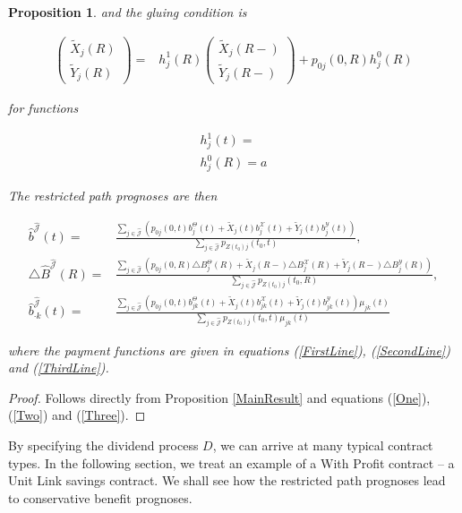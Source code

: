 \documentclass{article}
\newcommand{\1}[1]{\mathbbm{1}_{\left\lbrace #1 \right\rbrace}}
\theoremstyle{break}
\newtheorem{proposition}[definition]{Proposition}%
\theoremstyle{remark}
\numberwithin{equation}{section}
\begin{document}
\begin{proposition}
and the gluing condition is

\begin{align*}
\begin{pmatrix}\tilde{X}_j(R) \\ \tilde{Y}_j(R)\end{pmatrix} =& h_j^1(R) \begin{pmatrix}\tilde{X}_j(R-) \\ \tilde{Y}_j(R-)\end{pmatrix} + p_{0j}(0,R) h_j^0(R)
\end{align*}

for functions

\begin{align*}
	h_j^1(t) = \\
	h_j^0(R) = a
\end{align*}

The restricted path prognoses are then

\begin{align*}
	\hat{b}^{\hat{\mathcal{J}}}(t) =& \frac{\sum_{j \in \hat{\mathcal{J}}} \left( p_{0j}(0,t) b_j^\Theta(t) + \tilde{X}_j(t) b_j^\mathcal{X}(t) + \tilde{Y}_j(t) b_j^\mathcal{Y}(t)\right)}{\sum_{j \in \hat{\mathcal{J}}} p_{Z(t_0)j}(t_0,t)}, \\
	\triangle \hat{B}^{\hat{\mathcal{J}}}(R) =& \frac{\sum_{j \in \hat{\mathcal{J}}} \left(p_{0j}(0,R) \triangle B_j^\Theta(R) + \tilde{X}_j(R-) \triangle B_j^\mathcal{X}(R) + \tilde{Y}_j(R-) \triangle B_j^\mathcal{Y}(R)\right)}{\sum_{j \in \hat{\mathcal{J}}} p_{Z(t_0)j}(t_0,R)}, \\
	\hat{b}_{\cdot k}^{\hat{\mathcal{J}}}(t) =& \frac{\sum_{j \in \hat{\mathcal{J}}} \left(p_{0j}(0,t) b_{jk}^\Theta(t) + \tilde{X}_j(t) b_{jk}^\mathcal{X}(t) + \tilde{Y}_j(t) b_{jk}^\mathcal{Y}(t)\right) \mu_{jk}(t)}{\sum_{j \in \hat{\mathcal{J}}} p_{Z(t_0)j}(t_0,t) \mu_{jk}(t)}
\end{align*}

where the payment functions are given in equations (\ref{FirstLine}), (\ref{SecondLine}) and (\ref{ThirdLine}).
\end{proposition}
\begin{proof}
	Follows directly from Proposition \ref{MainResult} and equations (\ref{One}), (\ref{Two}) and (\ref{Three}).
\end{proof}

By specifying the dividend process $D$, we can arrive at many typical contract types. In the following section, we treat an example of a With Profit contract -- a Unit Link savings contract. We shall see how the restricted path prognoses lead to conservative benefit prognoses.
\end{document}
